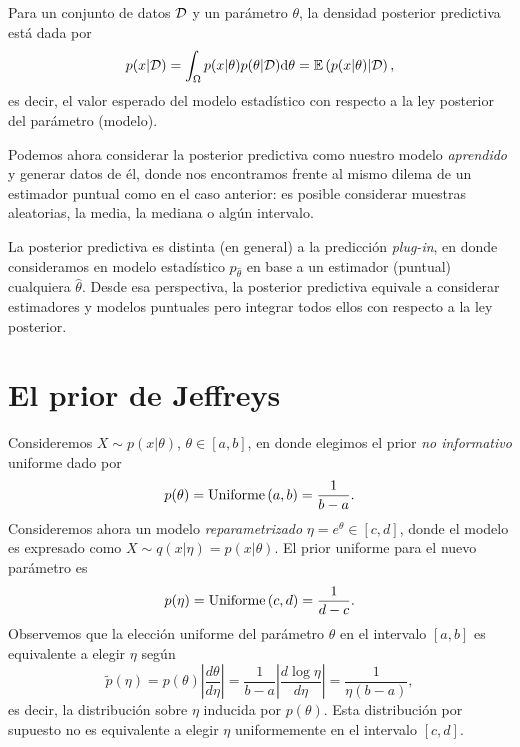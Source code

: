 \begin{definition}
Para un conjunto de datos ${\mathcal D}$ y un parámetro $\theta$, la densidad posterior predictiva está dada por
\begin{equation}
    p(x|{\mathcal D}) = \int_\Omega p(x|\theta)p(\theta|{\mathcal D}){\text{d}}\theta = \mathbb{E} \left(p(x|\theta) |{\mathcal D}\right),
\end{equation}
es decir, el valor esperado del modelo estadístico con respecto a la ley posterior del parámetro (modelo).
\end{definition}
Podemos ahora considerar la posterior predictiva como nuestro modelo \emph{aprendido} y generar datos de él, donde nos encontramos frente al mismo dilema de un estimador puntual como en el caso anterior: es posible considerar muestras aleatorias, la media, la mediana o algún intervalo. 

\begin{remark}
La posterior predictiva es distinta (en general) a la predicción \emph{plug-in}, en donde consideramos en modelo estadístico $p_{\hat\theta}$ en base a un estimador (puntual) cualquiera $\hat\theta$. Desde esa perspectiva, la posterior predictiva equivale a considerar estimadores y modelos puntuales pero integrar todos ellos con respecto a la ley posterior. 
\end{remark}

\newpage


\section{El prior de Jeffreys}

Consideremos $X\sim p(x|\theta)$, $\theta \in [a,b]$, en donde elegimos el prior \textit{no informativo} uniforme dado por 
$$
	p(\theta) =\text{Uniforme}\left(a,b\right) = \frac{1}{b-a}.
$$
Consideremos ahora un modelo \textit{reparametrizado} $\eta = e^\theta\in[c,d]$, donde el modelo es expresado como $X\sim q(x|\eta) = p(x|\theta) $. El prior uniforme para el nuevo parámetro es
\begin{equation}
	p(\eta) =\text{Uniforme}\left(c,d\right) = \frac{1}{d-c}.
\end{equation}
Observemos que la elección uniforme del parámetro $\theta$ en el intervalo $[a,b]$ es equivalente a elegir $\eta$ según
\begin{equation}
	\tilde{p}(\eta) = p(\theta) \left|\frac{d\theta}{d\eta}\right| = \frac{1}{b-a}\left|\frac{d\log\eta}{d\eta}\right|= \frac{1}{\eta (b-a)},
\end{equation}
es decir, la distribución sobre $\eta$ inducida por $p(\theta)$. Esta distribución por supuesto no es equivalente a elegir $\eta$ uniformemente en el intervalo $[c,d]$. 

